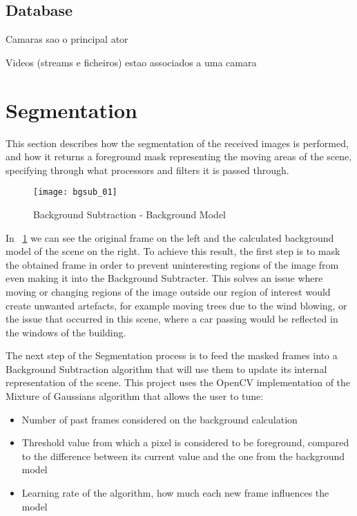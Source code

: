 \subsection{Database}

Camaras sao o principal ator

Videos (streams e ficheiros) estao associados a uma camara


\section{Segmentation}

This section describes how the segmentation of the received images is performed, and how it returns a foreground mask representing the moving areas of the scene, specifying through what processors and filters it is passed through. 

\begin{figure}[t]
  \begin{center}
    \leavevmode
    \texttt{[image: bgsub\_01]}
    \caption{Background Subtraction - Background Model}
    \label{fig:bgsub_01}
  \end{center}
\end{figure}

In ~\ref{fig:bgsub_01} we can see the original frame on the left and the calculated background model of the scene on the right. To achieve this result, the first step is to mask the obtained frame in order to prevent uninteresting regions of the image from even making it into the Background Subtracter. This solves an issue where moving or changing regions of the image outside our region of interest would create unwanted artefacts, for example moving trees due to the wind blowing, or the issue that occurred in this scene, where a car passing would be reflected in the windows of the building.

The next step of the Segmentation process is to feed the masked frames into a Background Subtraction algorithm that will use them to update its internal representation of the scene. This project uses the OpenCV implementation of the Mixture of Gaussians algorithm that allows the user to tune:

\begin{itemize}
	\item Number of past frames considered on the background calculation
	\item Threshold value from which a pixel is considered to be foreground, compared to the difference between its current value and the one from the background model
	\item Learning rate of the algorithm, how much each new frame influences the model
\end{itemize}

